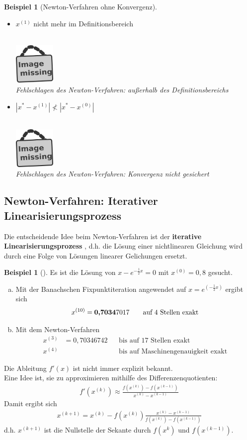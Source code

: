 \documentclass[ngerman,fontsize=11pt, paper=a4, parskip=half, titlepage=true, toc=bib]{scrbook}
\theoremstyle{definition}
\newtheorem{Bsp}[Def]{Beispiel}
\theoremstyle{plain}
\newcommand{\subsectione}[1]{\subsection{#1} \addtocounter{Def}{1}}
\newenvironment{Bspe}[1][]{ %
	\begin{Bsp}[#1]
	}
	{
	\end{Bsp}
	\addtocounter{subsection}{1}
}
\newcommand{\imagemissing}[1]{
  \begin{center}~\\
    \centering 
    \includegraphics[width=2cm]{images/image_missing.jpg}\\
    \textit{#1} \\
  \end{center}
}
\begin{document}
  


  \begin{Bspe}[Newton-Verfahren ohne Konvergenz]~
  	\begin{itemize}
  		\item $x^{(1)}$ nicht mehr im Definitionsbereich
  		\imagemissing{Fehlschlagen des Newton-Verfahren: außerhalb des Definitionsbereichs}
  		\item $|x^{*}-x^{(1)}| \nless |x^{*}-x^{(0)}| $
  		\imagemissing{Fehlschlagen des Newton-Verfahren: Konvergenz nicht gesichert}
  	\end{itemize}
  \end{Bspe}
  
  \subsectione{Newton-Verfahren: Iterativer Linearisierungsprozess}
  Die entscheidende Idee beim Newton-Verfahren ist der \textbf{iterative Linearisierungsprozess}
  , d.h. die Lösung einer nichtlinearen Gleichung wird
  durch eine Folge von Lösungen linearer Gelichungen ersetzt.
  
  \begin{Bspe}
  	\label{5.4.6}
  	Es ist die Lösung von $x-e^{-\frac{1}{2}x}=0$ mit $x^{(0)}=0,8$ gesucht.
  	\begin{enumerate}[a)]
  		\item Mit der Banachschen Fixpunktiteration angewendet auf 
  		$x=e^{(-\frac{1}{2}x)}$ ergibt sich
  		\begin{gather*}
  		x^{(10)}=\text{\bfseries 0,7034}7017 
  		\qquad \text{auf 4 Stellen exakt}
  		\end{gather*}
  		\item Mit dem Newton-Verfahren
  		\begin{align*}
  		x^{(3)}&= 0,70346742 &&\text{bis auf 17 Stellen exakt}\\
  		x^{(4)} &&& \text{bis auf Maschinengenauigkeit exakt}
  		\end{align*}		
  	\end{enumerate}
  \end{Bspe}
  Die Ableitung $f'(x)$ ist nicht immer explizit bekannt. \\
  Eine Idee ist, sie zu approximieren mithilfe des Differenzenquotienten:
  \begin{gather*}
    f'(x^{(k)})  \approx \frac{f(x^{(k)})-f(x^{(k-1)})}{x^{(k)}-x^{(k-1)}}
  \end{gather*}
  Damit ergibt sich
  \begin{gather*}
    x^{(k+1)} = x^{(k)}-f(x^{(k)}) \frac{x^{(k)} - x^{(k-1)}}{f(x^{(k)})-f(x^{(k-1)})}
  \end{gather*}
  d.h. $x^{(k+1)} $ ist die Nullstelle der Sekante durch $f(x^{k})$ und $f(x^{(k-1)})$.
  
\end{document}
